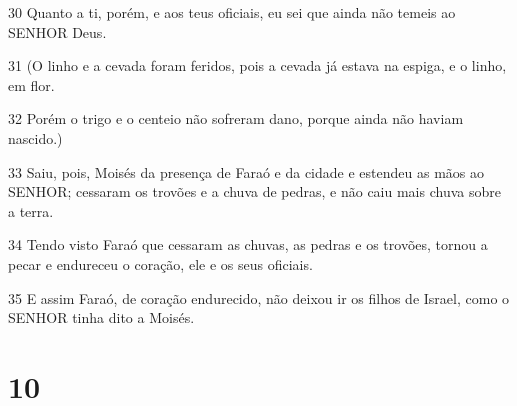 \par 30 Quanto a ti, porém, e aos teus oficiais, eu sei que ainda não temeis ao SENHOR Deus.
\par 31 (O linho e a cevada foram feridos, pois a cevada já estava na espiga, e o linho, em flor.
\par 32 Porém o trigo e o centeio não sofreram dano, porque ainda não haviam nascido.)
\par 33 Saiu, pois, Moisés da presença de Faraó e da cidade e estendeu as mãos ao SENHOR; cessaram os trovões e a chuva de pedras, e não caiu mais chuva sobre a terra.
\par 34 Tendo visto Faraó que cessaram as chuvas, as pedras e os trovões, tornou a pecar e endureceu o coração, ele e os seus oficiais.
\par 35 E assim Faraó, de coração endurecido, não deixou ir os filhos de Israel, como o SENHOR tinha dito a Moisés.

\chapter{10}

